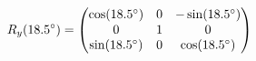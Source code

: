 \documentclass[preview]{standalone}
\begin{document}
\begin{align*}
\special{dvisvgm:raw <g id='unique000'>}R_y(18.5^\circ) = \begin{pmatrix} \cos(18.5^\circ) & 0 & -\sin(18.5^\circ) \\ 0 & 1 & 0 \\ \sin(18.5^\circ) & 0 & \cos(18.5^\circ) \end{pmatrix}\special{dvisvgm:raw </g>}
\end{align*}
\end{document}
